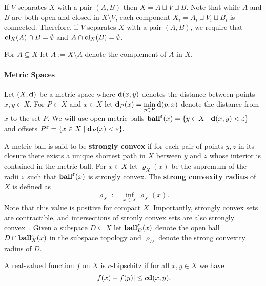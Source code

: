 If $V$ separates $X$ with a pair $(A, B)$ then $X = A\sqcup V\sqcup B$.
Note that while $A$ and $B$ are both open and closed in $X\setminus V$, each component $X_i = A_i\sqcup V_i\sqcup B_i$ is connected.
Therefore, if $V$ separates $X$ with a pair $(A, B)$, we require that $\mathbf{cl}_X(A)\cap B = \emptyset$ and $A\cap \mathbf{cl}_X(B) = \emptyset$.

For $A\subseteq X$ let $\overline{A} := X\setminus A$ denote the complement of $A$ in $X$.

\paragraph{Metric Spaces}

Let $(X,\mathbf{d})$ be a metric space where $\mathbf{d}(x, y)$ denotes the distance between points $x,y\in X$.
For $P\subset X$ and $x\in X$ let $\mathbf{d}_P(x) = \displaystyle\min_{p\in P}\mathbf{d}(p, x)$ denote the distance from $x$ to the set $P$.
We will use open metric balls $\mathbf{ball}^\varepsilon(x) = \{y\in X\mid \mathbf{d}(x, y) < \varepsilon\}$ and offsets $P^\varepsilon = \{x\in X\mid \mathbf{d}_P(x) < \varepsilon\}.$

A metric ball is said to be \textbf{strongly convex} if for each pair of points $y,z$ in its closure there exists a unique shortest path in $X$ between $y$ and $z$ whose interior is contained in the metric ball.
For $x\in X$ let $\varrho_X(x)$ be the supremum of the radii $\varepsilon$ such that $\mathbf{ball}^\varepsilon(x)$ is strongly convex.
The \textbf{strong convexity radius} of $X$ is defined as
\[ \varrho_X := \inf_{x\in X} \varrho_X(x).\]
Note that this value is positive for compact $X$.
Importantly, strongly convex sets are contractible, and intersections of stronly convex sets are also strongly convex~\cite{chazal09analysis}.
Given a subspace $D\subseteq X$ let $\mathbf{ball}_D^\varepsilon(x)$ denote the open ball $D\cap \mathbf{ball}_X^\varepsilon(x)$ in the subspace topology and $\varrho_D$ denote the strong convexity radius of $D$.

A real-valued function $f$ on $X$ is $c$-Lipschitz if for all $x,y\in X$ we have
\[
  |f(x) - f(y)| \le c \mathbf{d}(x,y).
\]

